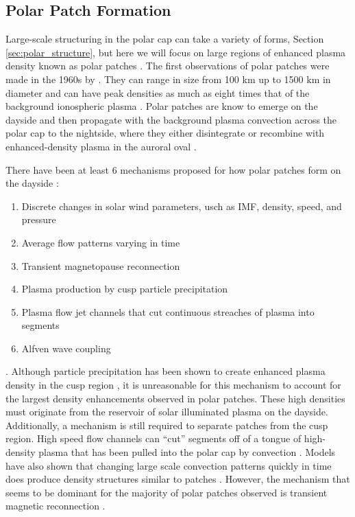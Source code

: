 \subsection{Polar Patch Formation}
\label{sec:lit_patches}
Large-scale structuring in the polar cap can take a variety of forms, Section \ref{sec:polar_structure}, but here we will focus on large regions of enhanced plasma density known as polar patches  \citep[e.g.][]{Weber1984,Weber1986,Buchau1983,Buchau1985}.  The first observations of polar patches were made in the 1960s by \citet{Hill1963}.  They can range in size from 100 km up to 1500 km in diameter and can have peak densities as much as eight times that of the background ionospheric plasma \citep{Weber1986,Hosokawa2014}.  Polar patches are know to emerge on the dayside and then propagate with the background plasma convection across the polar cap to the nightside, where they either disintegrate or recombine with enhanced-density plasma in the auroral oval \citep{Weber1985,Weber1986}.

There have been at least 6 mechanisms proposed for how polar patches form on the dayside \citep{Crowley1996,Carlson2012}:
\begin{enumerate}
	\item Discrete changes in solar wind parameters, usch as IMF, density, speed, and pressure \citep{Sojka1994}
	\item Average flow patterns varying in time \citep{Anderson1988}
	\item Transient magnetopause reconnection \citep{Lockwood1992b}
	\item Plasma production by cusp particle precipitation \citep{Rodger1994,Millward1999}
	\item Plasma flow jet channels that cut continuous streaches of plasma into segments 	\citep{Valladares1998}
	\item Alfven wave coupling \citep{Prikryl1999}
\end{enumerate}.
Although particle precipitation has been shown to create enhanced plasma density in the cusp region \citep{Rodger1994}, it is unreasonable for this mechanism to account for the largest density enhancements observed in polar patches.  These high densities must originate from the reservoir of solar illuminated plasma on the dayside.  Additionally, a mechanism is still required to separate patches from the cusp region.  High speed flow channels can ``cut'' segments off of a tongue of high-density plasma that has been pulled into the polar cap by convection \citep{Valladares1994,Valladares1998}.  Models have also shown that changing large scale convection patterns quickly in time does produce density structures similar to patches \citep{Anderson1988}.  However, the mechanism that seems to be dominant for the majority of polar patches observed is transient magnetic reconnection \citep{Carlson2012}.


